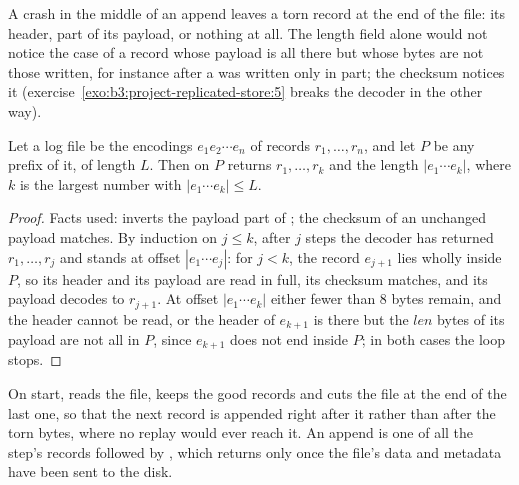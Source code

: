 \label{lst:b3:project-replicated-store:decode}

A crash in the middle of an append leaves a torn record at the end of the file: its header, part of its payload, or nothing at all. The length field alone would not notice the case of a record whose payload is all there but whose bytes are not those written, for instance after a  was written only in part; the checksum notices it (exercise~\ref{exo:b3:project-replicated-store:5} breaks the decoder in the other way).

\begin{proposition}\label{prop:b3:project-replicated-store:replay}
Let a log file be the encodings $e_1 e_2 \cdots e_n$ of records $r_1, \ldots, r_n$, and let $P$ be any prefix of it, of length $L$. Then  on $P$ returns $r_1, \ldots, r_k$ and the length $|e_1 \cdots e_k|$, where $k$ is the largest number with $|e_1 \cdots e_k| \leq L$.
\end{proposition}

\begin{proof}
Facts used:  inverts the payload part of ; the checksum of an unchanged payload matches. By induction on $j \leq k$, after $j$ steps the decoder has returned $r_1, \ldots, r_j$ and stands at offset $|e_1 \cdots e_j|$: for $j < k$, the record $e_{j+1}$ lies wholly inside $P$, so its header and its payload are read in full, its checksum matches, and its payload decodes to $r_{j+1}$. At offset $|e_1 \cdots e_k|$ either fewer than 8 bytes remain, and the header cannot be read, or the header of $e_{k+1}$ is there but the $len$ bytes of its payload are not all in $P$, since $e_{k+1}$ does not end inside $P$; in both cases the loop stops.
\end{proof}

On start,  reads the file, keeps the good records and cuts the file at the end of the last one, so that the next record is appended right after it rather than after the torn bytes, where no replay would ever reach it. An append is one  of all the step's records followed by , which returns only once the file's data and metadata have been sent to the disk. %

